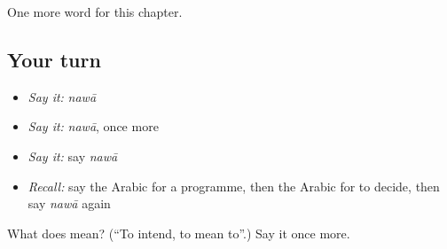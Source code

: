 \begin{grammarlens}[title={What you've built}]
One more word for this chapter.
\end{grammarlens}

\subsection*{Your turn}
\begin{itemize}
\raggedright
  \item \emph{Say it:} \emph{nawā}
  \item \emph{Say it:} \emph{nawā}, once more
  \item \emph{Say it:} say \emph{nawā}
  \item \emph{Recall:} say the Arabic for a programme, then the Arabic for to decide, then say \emph{nawā} again
\end{itemize}

\begin{tcolorbox}[breakable,colback=teal!4,colframe=teal!35!black,title={Before you move on}]
What does  mean? (\textquotedblleft{}To intend, to mean to\textquotedblright{}.) Say it once more.
\end{tcolorbox}

